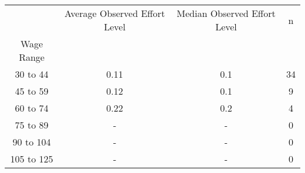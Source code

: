 \begin{tabular}{cccc}
\toprule
{} & Average Observed Effort Level & Median Observed Effort Level &   n \\
Wage Range &                               &                              &     \\
\midrule
30 to 44   &                          0.11 &                          0.1 &  34 \\
45 to 59   &                          0.12 &                          0.1 &   9 \\
60 to 74   &                          0.22 &                          0.2 &   4 \\
75 to 89   &                             - &                            - &   0 \\
90 to 104  &                             - &                            - &   0 \\
105 to 125 &                             - &                            - &   0 \\
\bottomrule
\end{tabular}
